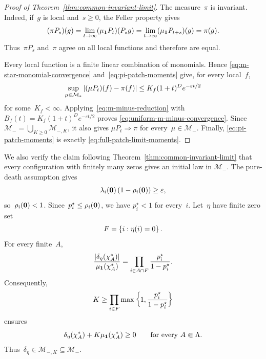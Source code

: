 \begin{proof}[Proof of Theorem~\ref{thm:common-invariant-limit}]
The measure~$\pi$ is invariant. Indeed, if~$g$ is local and~$s\geq0$, the
Feller property gives
\begin{equation*}
(\pi P_s)(g)
=
\lim_{t\to\infty}(\mu_{\mathbf{1}}P_t)(P_sg)
=
\lim_{t\to\infty}(\mu_{\mathbf{1}}P_{t+s})(g)
=
\pi(g).
\end{equation*}
Thus~$\pi P_s$ and~$\pi$ agree on all local functions and therefore are equal.

Every local function is a finite linear combination of monomials. Hence
\eqref{eq:m-star-monomial-convergence} and~\eqref{eq:pi-patch-moments} give, for
every local~$f$,
\begin{equation}
\label{eq:m-star-local-convergence}
\sup_{\mu\in\mathcal M_*}
\left|(\mu P_t)(f)-\pi(f)\right|
\leq
K_f(1+t)^D e^{-\varepsilon t/2}
\end{equation}
for some~$K_f<\infty$. Applying~\eqref{eq:m-minus-reduction} with
$B_f(t)=K_f(1+t)^D e^{-\varepsilon t/2}$ proves
\eqref{eq:uniform-m-minus-convergence}. Since
$\mathcal M_-=\bigcup_{K\geq0}\mathcal M_{-,K}$, it also gives
$\mu P_t\Rightarrow\pi$ for every~$\mu\in\mathcal M_-$. Finally,
\eqref{eq:pi-patch-moments} is exactly
\eqref{eq:full-patch-limit-moments}.
\end{proof}

We also verify the claim following Theorem~\ref{thm:common-invariant-limit}
that every configuration with finitely many zeros gives an initial law in
$\mathcal M_-$. The pure-death assumption gives
\begin{equation*}
\lambda_i(\mathbf{0})\left(1-\rho_i(\mathbf{0})\right)\geq\varepsilon,
\end{equation*}
so~$\rho_i(\mathbf{0})<1$. Since~$p_i^\star\leq\rho_i(\mathbf{0})$, we have
$p_i^\star<1$ for every~$i$. Let~$\eta$ have finite zero set
\begin{equation*}
F=\left\{i:\eta(i)=0\right\}.
\end{equation*}
For every finite~$A$,
\begin{equation*}
\frac{
\left|\delta_\eta(\chi_A^*)\right|
}{
\mu_{\mathbf{1}}(\chi_A^*)
}
=
\prod_{i\in A\cap F}
\frac{p_i^\star}{1-p_i^\star}.
\end{equation*}
Consequently,
\begin{equation*}
K
\geq
\prod_{i\in F}
\max\left\{1,\frac{p_i^\star}{1-p_i^\star}\right\}
\end{equation*}
ensures
\begin{equation*}
\delta_\eta(\chi_A^*)
+K\mu_{\mathbf{1}}(\chi_A^*)
\geq0
\qquad
\text{for every }A\Subset\Lambda.
\end{equation*}
Thus~$\delta_\eta\in\mathcal M_{-,K}\subseteq\mathcal M_-$.

